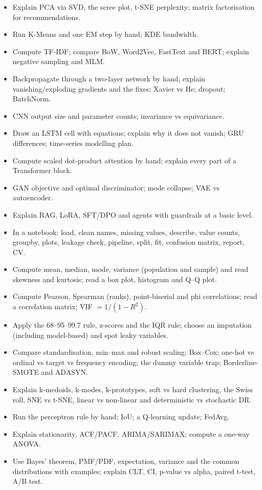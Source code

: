 \begin{itemize}
\item Explain PCA via SVD, the scree plot, t-SNE perplexity; matrix factorisation for recommendations.
\item Run K-Means and one EM step by hand; KDE bandwidth.
\item Compute TF-IDF; compare BoW, Word2Vec, FastText and BERT; explain negative sampling and MLM.
\item Backpropagate through a two-layer network by hand; explain vanishing/exploding gradients and the fixes; Xavier vs He; dropout; BatchNorm.
\item CNN output size and parameter counts; invariance vs equivariance.
\item Draw an LSTM cell with equations; explain why it does not vanish; GRU differences; time-series modelling plan.
\item Compute scaled dot-product attention by hand; explain every part of a Transformer block.
\item GAN objective and optimal discriminator; mode collapse; VAE vs autoencoder.
\item Explain RAG, LoRA, SFT/DPO and agents with guardrails at a basic level.
\item In a notebook: load, clean names, missing values, describe, value counts, groupby, plots, leakage check, pipeline, split, fit, confusion matrix, report, CV.
\item Compute mean, median, mode, variance (population and sample) and read skewness and kurtosis; read a box plot, histogram and Q--Q plot.
\item Compute Pearson, Spearman (ranks), point-biserial and phi correlations; read a correlation matrix; VIF $= 1/(1 - R^2)$.
\item Apply the 68--95--99.7 rule, z-scores and the IQR rule; choose an imputation (including model-based) and spot leaky variables.
\item Compare standardisation, min--max and robust scaling; Box--Cox; one-hot vs ordinal vs target vs frequency encoding; the dummy variable trap; Borderline-SMOTE and ADASYN.
\item Explain k-medoids, k-modes, k-prototypes, soft vs hard clustering, the Swiss roll, SNE vs t-SNE, linear vs non-linear and deterministic vs stochastic DR.
\item Run the perceptron rule by hand; IoU; a Q-learning update; FedAvg.
\item Explain stationarity, ACF/PACF, ARIMA/SARIMAX; compute a one-way ANOVA.
\item Use Bayes' theorem, PMF/PDF, expectation, variance and the common distributions with examples; explain CLT, CI, p-value vs alpha, paired t-test, A/B test.

\end{itemize}
